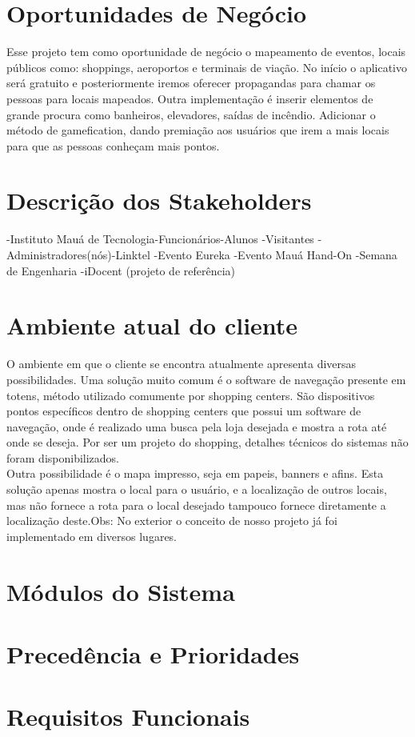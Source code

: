 \documentclass[12pt]{article}
\begin{document}
\section*{Oportunidades de Negócio}
	Esse projeto tem como oportunidade de negócio o mapeamento de eventos, locais públicos como: shoppings, aeroportos e terminais de viação.
	No início o aplicativo será gratuito e posteriormente iremos oferecer propagandas para chamar os pessoas para locais mapeados. Outra implementação é inserir elementos de grande procura como banheiros, elevadores, saídas de incêndio. Adicionar o método de gamefication, dando premiação aos usuários que irem a mais locais para que as pessoas conheçam mais pontos.
\section*{Descrição dos Stakeholders}
-Instituto Mauá de Tecnologia-Funcionários-Alunos -Visitantes -Administradores(nós)-Linktel -Evento Eureka 
-Evento Mauá Hand-On -Semana de Engenharia -iDocent (projeto de referência) 
\section*{Ambiente atual do cliente} 
O ambiente em que o cliente se encontra atualmente apresenta diversas possibilidades. Uma solução muito comum é o software de navegação presente em totens, método utilizado comumente por shopping centers. São dispositivos pontos específicos dentro de shopping centers que possui um software de navegação, onde é realizado uma busca pela loja desejada e mostra a rota até onde se deseja. Por ser um projeto do shopping, detalhes técnicos do sistemas não foram disponibilizados.\\
Outra possibilidade é o mapa impresso, seja em papeis, banners e afins. Esta solução apenas mostra o local para o usuário, e a localização de outros locais, mas não fornece a rota para o local desejado tampouco fornece diretamente a localização deste.Obs: No exterior o conceito de nosso projeto já foi implementado em diversos lugares.
\section*{Módulos do Sistema}
\section*{Precedência e Prioridades}
\section*{Requisitos Funcionais}
\end{document}
